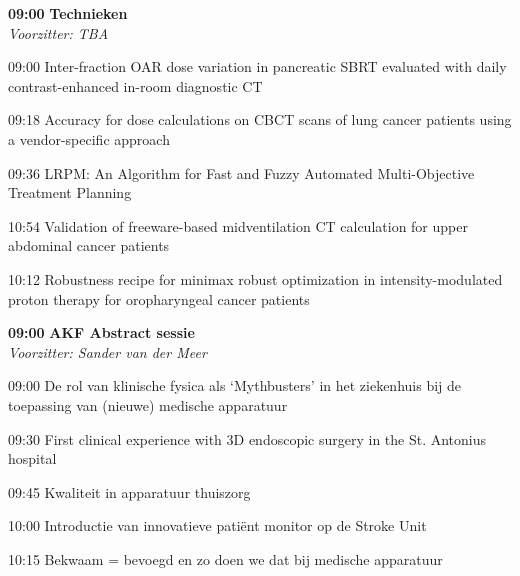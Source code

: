 \documentclass[a4paper,10pt]{report}
\begin{document}
\begin{multicols*}{3}

\begin{packed_enum}
\item[\textbf{09:00}]{\textbf{Technieken}}\\\textit{Voorzitter: TBA}
\item[09:00] Inter-fraction OAR dose variation in pancreatic SBRT evaluated with daily contrast-enhanced in-room diagnostic CT
\item[09:18] Accuracy for dose calculations on CBCT scans of lung cancer patients using a vendor-specific approach
\item[09:36] LRPM: An Algorithm for Fast and Fuzzy Automated Multi-Objective Treatment Planning
\item[10:54] Validation of freeware-based midventilation CT calculation for upper abdominal cancer patients
\item[10:12] Robustness recipe for minimax robust optimization in intensity-modulated proton therapy for oropharyngeal cancer patients
\end{packed_enum} %


\begin{packed_enum}
\item[\textbf{09:00}] \textbf{AKF Abstract sessie}\\\textit{Voorzitter: Sander van der Meer}
\item[09:00] De rol van klinische fysica als ‘Mythbusters’ in het ziekenhuis bij de toepassing van (nieuwe) medische apparatuur
\item[09:30] First clinical experience with 3D endoscopic surgery in the St. Antonius hospital
\item[09:45] Kwaliteit in apparatuur thuiszorg
\item[10:00] Introductie van innovatieve patiënt monitor op de Stroke Unit
\item[10:15] Bekwaam = bevoegd en zo doen we dat bij medische apparatuur
\end{packed_enum} %

\end{multicols*}
\end{document}
